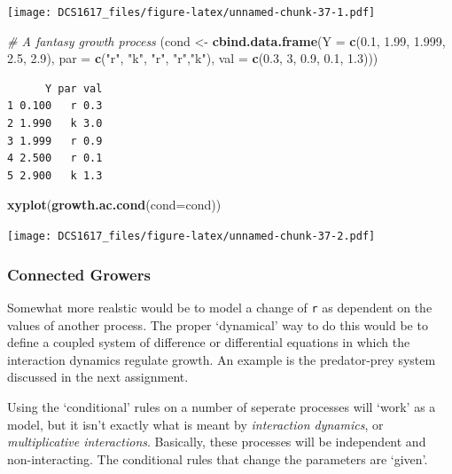 \documentclass[]{book}
\newenvironment{Shaded}{\begin{snugshade}}{\end{snugshade}}
\newcommand{\KeywordTok}[1]{\textcolor[rgb]{0.13,0.29,0.53}{\textbf{{#1}}}}
\newcommand{\DataTypeTok}[1]{\textcolor[rgb]{0.13,0.29,0.53}{{#1}}}
\newcommand{\DecValTok}[1]{\textcolor[rgb]{0.00,0.00,0.81}{{#1}}}
\newcommand{\FloatTok}[1]{\textcolor[rgb]{0.00,0.00,0.81}{{#1}}}
\newcommand{\StringTok}[1]{\textcolor[rgb]{0.31,0.60,0.02}{{#1}}}
\newcommand{\CommentTok}[1]{\textcolor[rgb]{0.56,0.35,0.01}{\textit{{#1}}}}
\newcommand{\NormalTok}[1]{{#1}}
\begin{document}
\texttt{[image: DCS1617\_files/figure-latex/unnamed-chunk-37-1.pdf]}

\begin{Shaded}
\begin{Highlighting}[]
\CommentTok{# A fantasy growth process}
\NormalTok{(cond <-}\StringTok{ }\KeywordTok{cbind.data.frame}\NormalTok{(}\DataTypeTok{Y =} \KeywordTok{c}\NormalTok{(}\FloatTok{0.1}\NormalTok{, }\FloatTok{1.99}\NormalTok{, }\FloatTok{1.999}\NormalTok{, }\FloatTok{2.5}\NormalTok{, }\FloatTok{2.9}\NormalTok{), }\DataTypeTok{par =} \KeywordTok{c}\NormalTok{(}\StringTok{"r"}\NormalTok{, }\StringTok{"k"}\NormalTok{, }\StringTok{"r"}\NormalTok{, }\StringTok{"r"}\NormalTok{,}\StringTok{"k"}\NormalTok{), }\DataTypeTok{val =} \KeywordTok{c}\NormalTok{(}\FloatTok{0.3}\NormalTok{, }\DecValTok{3}\NormalTok{, }\FloatTok{0.9}\NormalTok{, }\FloatTok{0.1}\NormalTok{, }\FloatTok{1.3}\NormalTok{)))}
\end{Highlighting}
\end{Shaded}

\begin{verbatim}
      Y par val
1 0.100   r 0.3
2 1.990   k 3.0
3 1.999   r 0.9
4 2.500   r 0.1
5 2.900   k 1.3
\end{verbatim}

\begin{Shaded}
\begin{Highlighting}[]
\KeywordTok{xyplot}\NormalTok{(}\KeywordTok{growth.ac.cond}\NormalTok{(}\DataTypeTok{cond=}\NormalTok{cond))}
\end{Highlighting}
\end{Shaded}

\texttt{[image: DCS1617\_files/figure-latex/unnamed-chunk-37-2.pdf]}

\subsubsection*{Connected Growers}\label{connected-growers-1}

Somewhat more realstic would be to model a change of \texttt{r} as
dependent on the values of another process. The proper `dynamical' way
to do this would be to define a coupled system of difference or
differential equations in which the interaction dynamics regulate
growth. An example is the predator-prey system discussed in the next
assignment.

Using the `conditional' rules on a number of seperate processes will
`work' as a model, but it isn't exactly what is meant by
\emph{interaction dynamics}, or \emph{multiplicative interactions}.
Basically, these processes will be independent and non-interacting. The
conditional rules that change the parameters are `given'.
\end{document}
